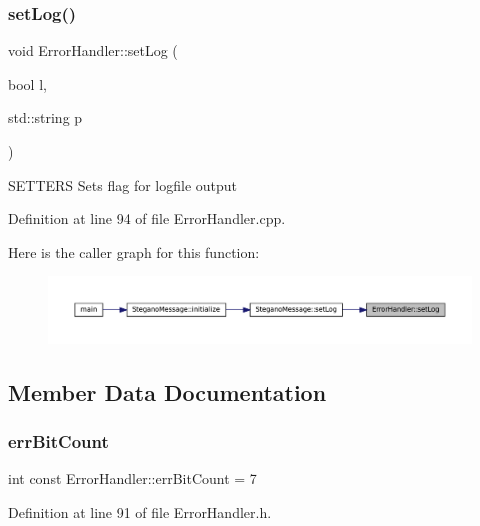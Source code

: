 \subsubsection{\texorpdfstring{setLog()}{setLog()}}
{\footnotesize\ttfamily void Error\+Handler\+::set\+Log (\begin{DoxyParamCaption}\item[{bool}]{l,  }\item[{std\+::string}]{p }\end{DoxyParamCaption})}

S\+E\+T\+T\+E\+RS Sets flag for logfile output 

Definition at line 94 of file Error\+Handler.\+cpp.

Here is the caller graph for this function\+:\nopagebreak
\begin{figure}[H]
\begin{center}
\leavevmode
\includegraphics[width=350pt]{classErrorHandler_aa79cfd994939c238b85ad021ea6bbe05_icgraph}
\end{center}
\end{figure}


\subsection{Member Data Documentation}
\mbox{\label{classErrorHandler_ae4e30eb033a9a5e2a04008a8be48ad67}} 
\subsubsection{\texorpdfstring{errBitCount}{errBitCount}}
{\footnotesize\ttfamily int const Error\+Handler\+::err\+Bit\+Count = 7\hspace{0.3cm}{\ttfamily [static]}}



Definition at line 91 of file Error\+Handler.\+h.

\mbox{\label{classErrorHandler_aaca2b9c33a1ad2bcc5d311cb4e5ca8f8}} 
